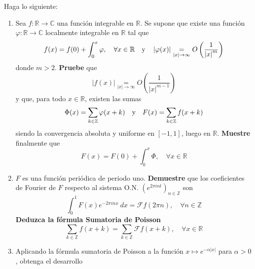 \documentclass[12pt]{report}
\newcounter{it}
\theoremstyle{largebreak}
\newcommand\abs[1]{\ensuremath{\left|#1\right|}}
\newcommand\cf[3]{\ensuremath{#1:#2\rightarrow#3}}
\newcommand{\fou}[1]{\ensuremath{\mathcal{F}#1}}
\begin{document}
    \begin{excer}
        Haga lo siguiente:
        \begin{enumerate}
            \item Sea $\cf{f}{\mathbb{R}}{\mathbb{C}}$ una función integrable en $\mathbb{R}$. Se supone que existe una función $\cf{\varphi}{\mathbb{R}}{\mathbb{C}}$ localmente integrable en $\mathbb{R}$ tal que
            \begin{equation*}
                f(x)=f(0)+\int_0^{x}\varphi,\quad\forall x\in\mathbb{R}\quad\textup{y}\quad\abs{\varphi(x)}\underset{\abs{x}\rightarrow\infty}{=}O\left(\frac{1}{\abs{x}^m}\right)
            \end{equation*}
            donde $m>2$. \textbf{Pruebe} que
            \begin{equation*}
                \abs{f(x)}\underset{\abs{x}\rightarrow\infty}{=}O\left(\frac{1}{\abs{x}^{ m-1}}\right)
            \end{equation*}
            y que, para todo $x\in\mathbb{R}$, existen las sumas
            \begin{equation*}
                \Phi(x)=\sum_{k\in\mathbb{Z}}\varphi(x+k)\quad\textup{y}\quad F(x)=\sum_{ k\in\mathbb{Z}}f(x+k)
            \end{equation*}
            siendo la convergencia absoluta y uniforme en $[-1,1]$, luego en $\mathbb{R}$. \textbf{Muestre} finalmente que
            \begin{equation*}
                F(x)=F(0)+\int_0^x\Phi,\quad\forall x\in\mathbb{R}
            \end{equation*}
            \item $F$ es una función periódica de periodo uno. \textbf{Demuestre} que los coeficientes de Fourier de $F$ respecto al sistema O.N. $\left(e^{2\pi int} \right)_{n\in\mathbb{Z}}$ son
            \begin{equation*}
                \int_0^1 F(x)e^{ -2\pi inx}\:dx=\fou{f}(2\pi n),\quad\forall n\in\mathbb{Z}
            \end{equation*}
            \textbf{Deduzca la fórmula Sumatoria de Poisson}
            \begin{equation*}
                \sum_{ k\in\mathbb{Z}}f(x+k)=\sum_{ k\in\mathbb{Z}}\fou{f}(x+k),\quad\forall x\in\mathbb{R}
            \end{equation*}
            \item Aplicando la fórmula sumatoria de Poisson a la función $x\mapsto e^{-\alpha\abs{x}}$ para $\alpha>0$, obtenga el desarrollo

\end{enumerate}
\end{excer}
\end{document}
